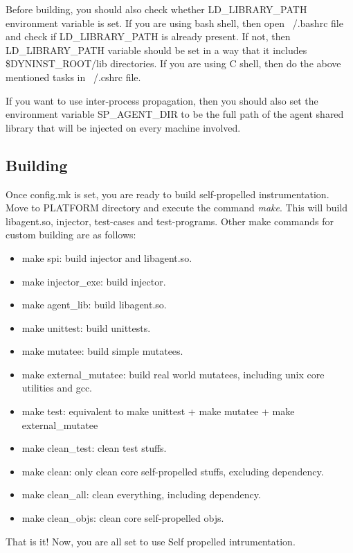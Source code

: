 Before building, you should also check whether LD\_LIBRARY\_PATH environment
variable is set. If you are using bash shell, then open ~/.bashrc file and check
if LD\_LIBRARY\_PATH is already present. If not, then LD\_LIBRARY\_PATH variable
should be set in a way that it includes {\$DYNINST\_ROOT}/lib directories.  If
you are using C shell, then do the above mentioned tasks in ~/.cshrc file.

If you want to use inter-process propagation, then you should also set the
environment variable SP\_AGENT\_DIR to be the full path of the agent shared
library that will be injected on every machine involved.
 
\subsection{Building}
Once config.mk is set, you are ready to build self-propelled
instrumentation. Move to PLATFORM directory and execute the command
\textit{make}. This will build libagent.so, injector, test-cases and
test-programs. Other make commands for custom building are as follows:

\begin{itemize}
\item make spi: build injector and libagent.so.
\item make injector\_exe: build injector.
\item make agent\_lib: build libagent.so.
\item make unittest: build unittests.
\item make mutatee: build simple mutatees.
\item make external\_mutatee: build real world mutatees, including unix core
  utilities and gcc.
\item make test: equivalent to make unittest + make mutatee + make
  external\_mutatee
\item make clean\_test: clean test stuffs.
\item make clean: only clean core self-propelled stuffs, excluding dependency.
\item make clean\_all: clean everything, including dependency.
\item make clean\_objs: clean core self-propelled objs.
\end{itemize}

That is it! Now, you are all set to use Self propelled intrumentation.
